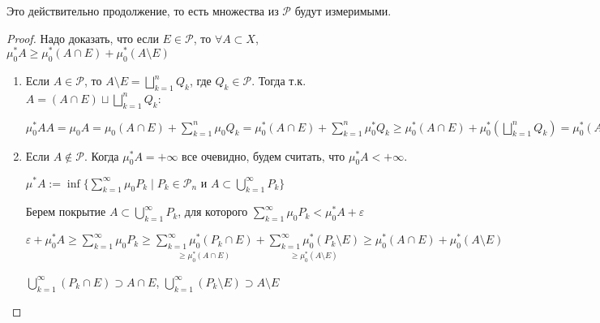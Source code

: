 \begin{theorem}
    Это действительно продолжение, то есть множества из $\mathcal{P}$ будут измеримыми.
\end{theorem}

\begin{proof}
    Надо доказать, что если $E\in \mathcal{P}$, то $\forall A\subset X$, $\mu_0^* A \geq \mu_0^* (A\cap E)+\mu_0^* (A\setminus E)$

    \begin{enumerate}
        \item Если $A\in \mathcal{P}$, то $A\setminus E =\bigsqcup \limits_{k=1}^n Q_k$, где $Q_k\in \mathcal{P}$. 
        Тогда т.к. $A=(A\cap E)\sqcup \bigsqcup \limits_{k=1}^n Q_k$:

        $\mu_0^* A A = \mu_0 A =\mu_0(A\cap E)+\sum \limits_{k=1}^n \mu_0 Q_k=\mu^*_0(A\cap E)+\sum \limits_{k=1}^n \mu^*_0 Q_k
        \geq \mu_0^* (A\cap E)+\mu_0^* (\bigsqcup \limits_{k=1}^n Q_k)= \mu_0^* (A\cap E)+\mu_0^* (A\setminus E)$

        \item Если $A\not\in \mathcal{P}$. Когда $\mu_0^* A=+\infty$ все очевидно, будем считать, что $\mu_0^* A<+\infty$.
        
        $\mu^* A:=\inf \{\sum\limits_{k=1}^\infty \mu_0 P_k\mid P_k\in \mathcal{P}_n\text{ и } A\subset \bigcup\limits_{k=1}^\infty P_k\}$

        Берем покрытие $A\subset \bigcup\limits_{k=1}^\infty P_k$, для которого $\sum \limits_{k=1}^\infty \mu_0 P_k<\mu_0^* A+\varepsilon$

        $\varepsilon+\mu_0^* A\geq \sum \limits_{k=1}^\infty \mu_0 P_k\geq \underset{\geq \mu_0^* (A\cap E)}{\sum \limits_{k=1}^\infty \mu_0^* (P_k\cap E)}+
        \underset{\geq \mu_0^* (A\setminus E)}{\sum \limits_{k=1}^\infty \mu_0^* (P_k\setminus E)}\geq \mu_0^* (A\cap E)+\mu_0^* (A\setminus E)$

        $\bigcup\limits_{k=1}^\infty (P_k\cap E)\supset A \cap E$, $\bigcup\limits_{k=1}^\infty (P_k\setminus E)\supset A \setminus E$
    \end{enumerate}
\end{proof}


